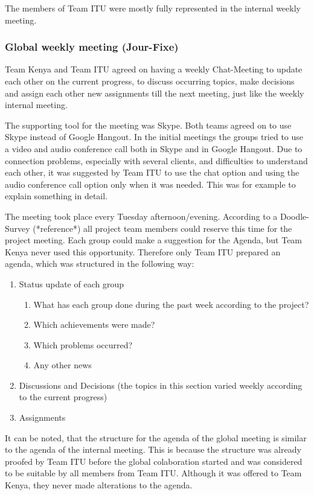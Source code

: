 The members of Team ITU were mostly fully represented in the internal weekly meeting. 

\subsubsection {Global weekly meeting (Jour-Fixe)}
Team Kenya and Team ITU agreed on having a weekly Chat-Meeting to update each other on the current progress, to discuss occurring topics, make decisions and assign each other new assignments till the next meeting, just like the weekly internal meeting.

The supporting tool for the meeting was Skype. Both teams agreed on to use Skype instead of Google Hangout. In the initial meetings the groups tried to use a video and audio conference call both in Skype and in Google Hangout. Due to connection problems, especially with several clients, and difficulties to understand each other, it was suggested by Team ITU to use the chat option and using the audio conference call option only when it was needed. This was for example to explain something in detail.

The meeting took place every Tuesday afternoon/evening. According to a Doodle-Survey (*reference*) all project team members could reserve this time for the project meeting. Each group could make a suggestion for the Agenda, but Team Kenya never used this opportunity. Therefore only Team ITU prepared an agenda, which was structured in the following way:

	\begin{enumerate}
		\item Status update of each group
			\begin{enumerate}
				\item What has each group done during the past week according to the project?
				\item Which achievements were made?	
				\item Which problems occurred?
				\item Any other news
			\end{enumerate}
		\item Discussions and Decisions (the topics in this section varied weekly according to the current progress)
		\item Assignments
	\end{enumerate}

It can be noted, that the structure for the agenda of the global meeting is similar to the agenda of the internal meeting. This is because the structure was already proofed by Team ITU before the global colaboration started and was considered to be suitable by all members from Team ITU. Although it was offered to Team Kenya, they never made alterations to the agenda.

